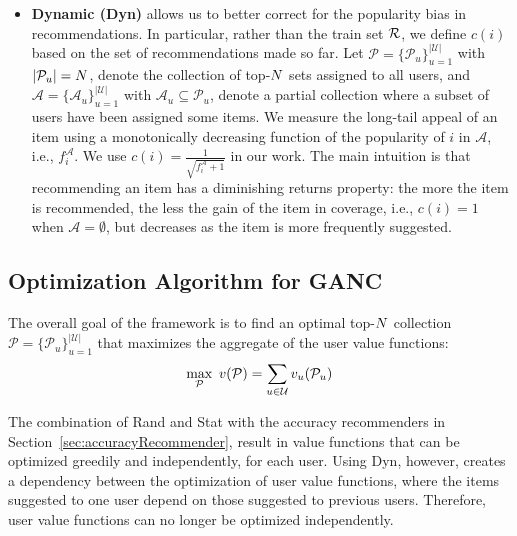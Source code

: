 \begin{itemize}
\item \textbf{Dynamic (Dyn)}  allows us to better correct for the popularity bias in recommendations. In particular,  rather than the train set $\mathcal{R}$,  we  define $c(i)$ based on the set of recommendations  made so far. Let $\mathcal{P}  = \{ \mathcal{P}_u \}_{u=1}^ {|\mathcal{U}|} $ with $|\mathcal{P}_u| = N$, denote the collection of top-$N$ sets assigned to all users, and $\mathcal{A}  = \{ \mathcal{A}_u \}_{u=1}^ {|\mathcal{U}|} $  with $\mathcal{A}_u \subseteq \mathcal{P}_u$, denote  a partial collection where  a subset of users have been assigned  some items. We measure the long-tail appeal  of an item  using a monotonically decreasing function of the popularity of $i$ in $\mathcal{A}$, i.e.,  $f_i^{\mathcal{A}}$. We use 
$c(i) = \frac{1}{\sqrt{ f_i^{\mathcal{A}} + 1} }\label{eq:coverage}$  in our work.  The main intuition is that recommending an item  has a diminishing returns property:  the more the item is recommended, the less the gain of the item in coverage, i.e., $c(i)=1$ when $\mathcal{A} = \emptyset$, but decreases as the item is more frequently suggested.%

\end{itemize}
  
 
\subsection{Optimization Algorithm for GANC }
\label{sec:optimizationAlgorithm}
The overall goal of the framework is to find an optimal top-$N$ collection $\mathcal{P}  = \{ \mathcal{P}_u \}_{u=1}^ {|\mathcal{U}|} $  that  maximizes  the  aggregate of the user value functions:
\begin{align}
\small
\max_{\mathcal{P} } \ v(\mathcal{P}) = \sum_{u \in \mathcal{U}} v_{u}(\mathcal{P}_{u})
\label{eq:overallValueFunction}
\end{align}

The combination of Rand and Stat with the accuracy recommenders in Section~\ref{sec:accuracyRecommender}, result in value functions that can be optimized greedily and independently, for each user. Using Dyn, however,  creates a dependency between the optimization of user value functions, where the items suggested to one user depend on those suggested to previous users.  Therefore,  user value functions can no longer be optimized independently. 



